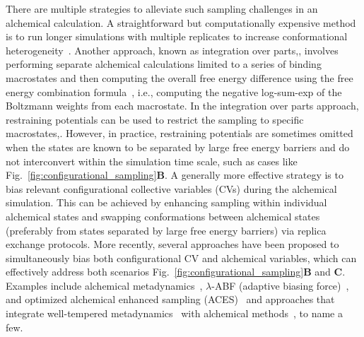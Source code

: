 \documentclass[9pt,bestpractices]{livecoms}
\begin{document}
There are multiple strategies to alleviate such sampling challenges in an alchemical calculation. A straightforward but computationally expensive method is to run longer simulations with multiple replicates to increase conformational heterogeneity~\cite{suruzhon2021sensitivity}. Another approach, known as integration over parts,\cite{jayachandran2006parallelized}, involves performing separate alchemical calculations limited to a series of binding macrostates and  then computing the overall free energy difference using the free energy combination formula~\cite{gallicchio2011recent,hsu2023alchemical}, i.e., computing the negative log-sum-exp of the Boltzmann weights from each macrostate. In the integration over parts approach, restraining potentials can be used to restrict the sampling to specific macrostates,\cite{khuttan2023taming}. However, in practice, restraining potentials are sometimes omitted when the states are known to be separated by large free energy barriers and do not interconvert within the simulation time scale, such as cases like Fig.~\ref{fig:configurational_sampling}\textbf{B}. A generally more effective strategy is to bias relevant configurational collective variables (CVs) during the alchemical simulation. This can be achieved by enhancing sampling within individual alchemical states and swapping conformations between alchemical states (preferably from states separated by large free energy barriers) via replica exchange protocols. More recently, several approaches have been proposed to simultaneously bias both configurational CV and alchemical variables, which can effectively address both scenarios Fig.~\ref{fig:configurational_sampling}\textbf{B} and \textbf{C}. Examples include alchemical metadynamics~\cite{hsu2023alchemical}, $\lambda$-ABF (adaptive biasing force)~\cite{lagardere2024lambda}, and optimized alchemical enhanced sampling (ACES)~\cite{lee2023aces}  and approaches that integrate well-tempered metadynamics~\cite{barducci2008well} with alchemical methods~\cite{zhou2025zooming, khuttan2024make}, to name a few.
\end{document}
